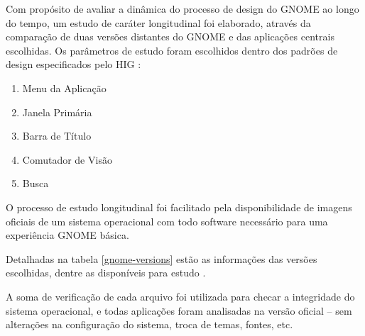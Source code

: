 Com propósito de avaliar a dinâmica do processo de design do GNOME ao longo do
tempo, um estudo de caráter longitudinal foi elaborado, através da comparação de
duas versões distantes do GNOME e das aplicações centrais escolhidas. Os
parâmetros de estudo foram escolhidos dentro dos padrões de design especificados
pelo HIG \cite{hig314patterns}:

\begin{enumerate}
  \item Menu da Aplicação
  \item Janela Primária
  \item Barra de Título
  \item Comutador de Visão
  \item Busca
\end{enumerate}

O processo de estudo longitudinal foi facilitado pela disponibilidade de imagens
oficiais de um sistema operacional com todo software necessário para uma
experiência GNOME básica.

Detalhadas na tabela \ref{gnome-versions} estão as informações das versões
escolhidas, dentre as disponíveis para estudo \cite {gnome2015promo-usb}.

A soma de verificação de cada arquivo foi utilizada para checar a integridade do
sistema operacional, e todas aplicações foram analisadas na versão oficial --
sem alterações na configuração do sistema, troca de temas, fontes, etc.


\begin{table}[htb]
\centering
{}
\end{table}


